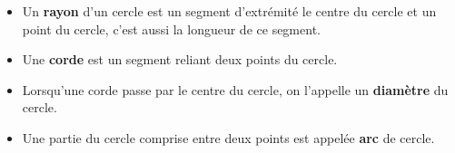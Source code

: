 \begin{definition}
    \begin{itemize}
       \item Un {\bf rayon} d'un cercle est un segment d'extrémité le centre du cercle et un point du cercle, c'est aussi la longueur de ce segment.
       \item Une \textbf{corde} est un segment reliant deux points du cercle.
       \item Lorsqu'une corde passe par le centre du cercle, on l'appelle un \textbf{diamètre} du cercle.
       \item Une partie du cercle comprise entre deux points est appelée \textbf{arc} de cercle.
    \end{itemize}
 \end{definition}
 
